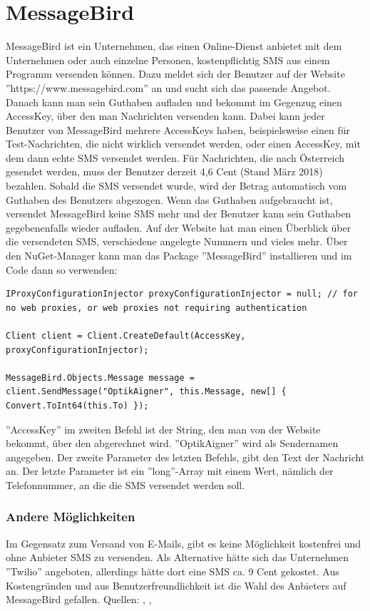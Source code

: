 \section{MessageBird}
MessageBird ist ein Unternehmen, das einen Online-Dienst anbietet mit dem  Unternehmen oder auch einzelne Personen, kostenpflichtig SMS aus einem Programm versenden können. Dazu meldet sich der Benutzer auf der Website ''https://www.messagebird.com'' an und sucht sich das passende Angebot. Danach kann man sein Guthaben aufladen und bekommt im Gegenzug einen AccessKey, über den man Nachrichten versenden kann. Dabei kann jeder Benutzer von MessageBird mehrere AccessKeys haben, beispielsweise einen für Test-Nachrichten, die nicht wirklich versendet werden, oder einen AccessKey, mit dem dann echte SMS versendet werden. Für Nachrichten, die nach Österreich gesendet werden, muss der Benutzer derzeit 4,6 Cent (Stand März 2018) bezahlen. Sobald die SMS versendet wurde, wird der Betrag automatisch vom Guthaben des Benutzers abgezogen. Wenn das Guthaben aufgebraucht ist, versendet MessageBird keine SMS mehr und der Benutzer kann sein Guthaben gegebenenfalls wieder aufladen. Auf der Website hat man einen Überblick über die versendeten SMS, verschiedene angelegte Nummern und vieles mehr. \newline Über den NuGet-Manager kann man das Package ''MessageBird'' installieren und im Code dann so verwenden:
\begin{lstlisting}
IProxyConfigurationInjector proxyConfigurationInjector = null; // for no web proxies, or web proxies not requiring authentication

Client client = Client.CreateDefault(AccessKey, proxyConfigurationInjector);

MessageBird.Objects.Message message = client.SendMessage("OptikAigner", this.Message, new[] { Convert.ToInt64(this.To) });
\end{lstlisting}
''AccessKey'' im zweiten Befehl ist der String, den man von der Website bekommt, über den abgerechnet wird. ''OptikAigner'' wird als Sendernamen angegeben. Der zweite Parameter des letzten Befehls, gibt den Text der Nachricht an. Der letzte Parameter ist ein ''long''-Array mit einem Wert, nämlich der Telefonnummer, an die die SMS versendet werden soll.

\subsubsection{Andere Möglichkeiten}
Im Gegensatz zum Versand von E-Mails, gibt es keine Möglichkeit kostenfrei und ohne Anbieter SMS zu versenden. Als Alternative hätte sich das Unternehmen ''Twilio'' angeboten, allerdings hätte dort eine SMS ca. 9 Cent gekostet. Aus Kostengründen und aus Benutzerfreundlichkeit ist die Wahl des Anbieters auf MessageBird gefallen.
\newline Quellen: \cite{messagebird_sms_2018}, \cite{messagebird_preise_2018}, \cite{twilio_sms_2018}



